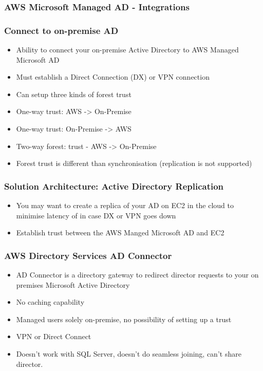 \subsubsection{AWS Microsoft Managed AD - Integrations}

\subsubsection{Connect to on-premise AD}
\begin{itemize}
    \item Ability to connect your on-premise Active Directory to AWS Managed Microsoft AD
    \item Must establish a Direct Connection (DX) or VPN connection
    \item Can setup three kinds of forest trust
    \item One-way trust: AWS -> On-Premise
    \item One-way trust: On-Premise -> AWS
    \item Two-way forest: trust - AWS -> On-Premise
    \item Forest trust is different than synchronisation (replication is not supported)
\end{itemize}

\subsubsection{Solution Architecture: Active Directory Replication}
\begin{itemize}
    \item You may want to create a replica of your AD on EC2 in the cloud to minimise latency of in case DX or VPN goes down
    \item Establish trust between the AWS Manged Microsoft AD and EC2
\end{itemize}

\subsubsection{AWS Directory Services AD Connector}
\begin{itemize}
    \item AD Connector is a directory gateway to redirect director requests to your on premises Microsoft Active Directory
    \item No caching capability
    \item Managed users solely on-premise, no possibility of setting up a trust
    \item VPN or Direct Connect
    \item Doesn't work with SQL Server, doesn't do seamless joining, can't share director.
\end{itemize}

